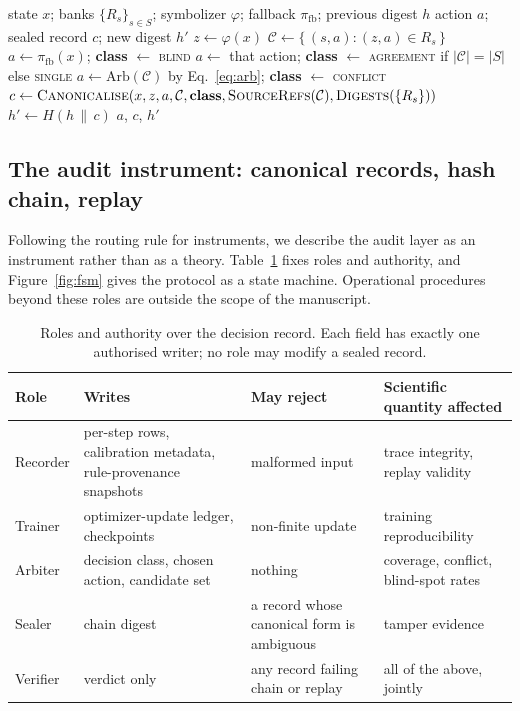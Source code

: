 \documentclass[11pt,a4paper]{article}
\begin{document}
\begin{algorithm}[t]
\caption{Provenance-aware decision and record emission}
\label{alg:decide}
\begin{algorithmic}[1]
\Require state $x$; banks $\{R_{s}\}_{s\in S}$; symbolizer $\varphi$; fallback $\pi_{\mathrm{fb}}$; previous digest $h$
\Ensure action $a$; sealed record $c$; new digest $h'$
\State $z \gets \varphi(x)$
\State $\mathcal{C} \gets \{\, (s,a) : (z,a)\in R_{s} \,\}$ 
  \State $a \gets \pi_{\mathrm{fb}}(x)$; \textbf{class} $\gets$ \textsc{blind}
  \State $a \gets$ that action; \textbf{class} $\gets$ \textsc{agreement} if $|\mathcal{C}|=|S|$ else \textsc{single}
\Else
  \State $a \gets \mathrm{Arb}(\mathcal{C})$ by Eq.~\eqref{eq:arb}; \textbf{class} $\gets$ \textsc{conflict}
\EndIf
\State $c \gets \textsc{Canonicalise}(x, z, a, \mathcal{C}, \textbf{class}, \textsc{SourceRefs}(\mathcal{C}), \textsc{Digests}(\{R_{s}\}))$
\State $h' \gets H(h \,\|\, c)$
\State \Return $a$, $c$, $h'$
\end{algorithmic}
\end{algorithm}

\subsection{The audit instrument: canonical records, hash chain, replay}
\label{sec:method-audit}

Following the routing rule for instruments, we describe the audit layer as an instrument rather than as a theory. Table~\ref{tab:roles} fixes roles and authority, and Figure~\ref{fig:fsm} gives the protocol as a state machine. Operational procedures beyond these roles are outside the scope of the manuscript.

\begin{table}[H]
\centering
\caption{Roles and authority over the decision record. Each field has exactly one authorised writer; no role may modify a sealed record.}
\label{tab:roles}
\small
\begin{tabularx}{\textwidth}{@{}>{\raggedright\arraybackslash}p{17mm} >{\raggedright\arraybackslash}p{44mm} >{\raggedright\arraybackslash}p{34mm} >{\raggedright\arraybackslash}X@{}}
\toprule
\textbf{Role} & \textbf{Writes} & \textbf{May reject} & \textbf{Scientific quantity affected} \\
\midrule
Recorder & per-step rows, calibration metadata, rule-provenance snapshots & malformed input & trace integrity, replay validity \\
Trainer & optimizer-update ledger, checkpoints & non-finite update & training reproducibility \\
Arbiter & decision class, chosen action, candidate set & nothing & coverage, conflict, blind-spot rates \\
Sealer & chain digest & a record whose canonical form is ambiguous & tamper evidence \\
Verifier & verdict only & any record failing chain or replay & all of the above, jointly \\
\bottomrule
\end{tabularx}
\end{table}
\end{document}
